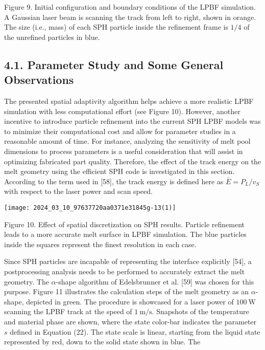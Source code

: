 \documentclass[10pt]{article}
\begin{document}
Figure 9. Initial configuration and boundary conditions of the LPBF simulation. A Gaussian laser beam is scanning the track from left to right, shown in orange. The size (i.e., mass) of each SPH particle inside the refinement frame is $1 / 4$ of the unrefined particles in blue.

\subsection*{4.1. Parameter Study and Some General Observations}
The presented spatial adaptivity algorithm helps achieve a more realistic LPBF simulation with less computational effort (see Figure 10). However, another incentive to introduce particle refinement into the current SPH LPBF models was to minimize their computational cost and allow for parameter studies in a reasonable amount of time. For instance, analyzing the sensitivity of melt pool dimensions to process parameters is a useful consideration that will assist in optimizing fabricated part quality. Therefore, the effect of the track energy on the melt geometry using the efficient SPH code is investigated in this section. According to the term used in [58], the track energy is defined here as $\bar{E}=P_{L} / v_{S}$ with respect to the laser power and scan speed.

\begin{center}
\texttt{[image: 2024\_03\_10\_97637720aa0371e31845g-13(1)]}
\end{center}

Figure 10. Effect of spatial discretization on SPH results. Particle refinement leads to a more accurate melt surface in LPBF simulation. The blue particles inside the squares represent the finest resolution in each case.

Since SPH particles are incapable of representing the interface explicitly [54], a postprocessing analysis needs to be performed to accurately extract the melt geometry. The $\alpha$-shape algorithm of Edelsbrunner et al. [59] was chosen for this purpose. Figure 11 illustrates the calculation steps of the melt geometry as an $\alpha$-shape, depicted in green. The procedure is showcased for a laser power of $100 \mathrm{~W}$ scanning the LPBF track at the speed of $1 \mathrm{~m} / \mathrm{s}$. Snapshots of the temperature and material phase are shown, where the state color-bar indicates the parameter $s$ defined in Equation (22). The state scale is linear, starting from the liquid state represented by red, down to the solid state shown in blue. The
\end{document}
